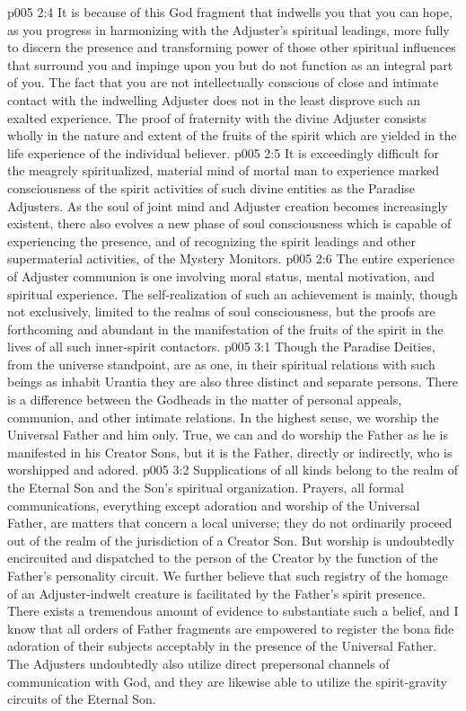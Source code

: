 \vs p005 2:4 \pc It is because of this God fragment that indwells you that you can hope, as you progress in harmonizing with the Adjuster’s spiritual leadings, more fully to discern the presence and transforming power of those other spiritual influences that surround you and impinge upon you but do not function as an integral part of you. The fact that you are not intellectually conscious of close and intimate contact with the indwelling Adjuster does not in the least disprove such an exalted experience. The proof of fraternity with the divine Adjuster consists wholly in the nature and extent of the fruits of the spirit which are yielded in the life experience of the individual believer. 
\vs p005 2:5 It is exceedingly difficult for the meagrely spiritualized, material mind of mortal man to experience marked consciousness of the spirit activities of such divine entities as the Paradise Adjusters. As the soul of joint mind and Adjuster creation becomes increasingly existent, there also evolves a new phase of soul consciousness which is capable of experiencing the presence, and of recognizing the spirit leadings and other supermaterial activities, of the Mystery Monitors.
\vs p005 2:6 The entire experience of Adjuster communion is one involving moral status, mental motivation, and spiritual experience. The self\hyp{}realization of such an achievement is mainly, though not exclusively, limited to the realms of soul consciousness, but the proofs are forthcoming and abundant in the manifestation of the fruits of the spirit in the lives of all such inner\hyp{}spirit contactors.
\vs p005 3:1 Though the Paradise Deities, from the universe standpoint, are as one, in their spiritual relations with such beings as inhabit Urantia they are also three distinct and separate persons. There is a difference between the Godheads in the matter of personal appeals, communion, and other intimate relations. In the highest sense, we worship the Universal Father and him only. True, we can and do worship the Father as he is manifested in his Creator Sons, but it is the Father, directly or indirectly, who is worshipped and adored.
\vs p005 3:2 Supplications of all kinds belong to the realm of the Eternal Son and the Son’s spiritual organization. Prayers, all formal communications, everything except adoration and worship of the Universal Father, are matters that concern a local universe; they do not ordinarily proceed out of the realm of the jurisdiction of a Creator Son. But worship is undoubtedly encircuited and dispatched to the person of the Creator by the function of the Father’s personality circuit. We further believe that such registry of the homage of an Adjuster\hyp{}indwelt creature is facilitated by the Father’s spirit presence. There exists a tremendous amount of evidence to substantiate such a belief, and I know that all orders of Father fragments are empowered to register the bona fide adoration of their subjects acceptably in the presence of the Universal Father. The Adjusters undoubtedly also utilize direct prepersonal channels of communication with God, and they are likewise able to utilize the spirit\hyp{}gravity circuits of the Eternal Son.
